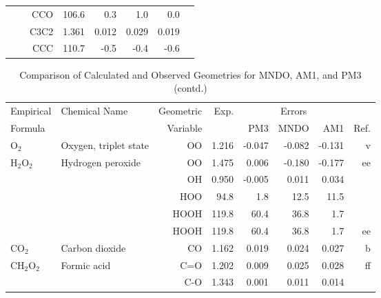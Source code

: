 \begin{table}
\begin{center}
\begin{tabular}{llrrrrrr}
             &                                    &CCO         &     106.6   &       0.3 &       1.0 &       0.0   &       \\
             &                                    &C3C2          &     1.361   &     0.012 &     0.029 &     0.019 &       \\
             &                                    &CCC         &     110.7   &      -0.5 &      -0.4 &      -0.6   &       \\
\hline
\end{tabular}
\end{center}
\end{table}
\clearpage

\begin{table}
\caption{\label{geotabd}Comparison of Calculated and Observed Geometries for 
MNDO, AM1, and PM3 (contd.)}
\begin{center}
\compresstable
\begin{tabular}{llrrrrrr}
 Empirical  & Chemical Name &  Geometric &  Exp. & \multicolumn{3}{c}{Errors} & \\
  Formula   &               &  Variable &        & PM3  & MNDO  &  AM1 & Ref.\\
\hline
 O$_2$          & Oxygen, triplet state              &OO            &     1.216   &    -0.047 &    -0.082 &    -0.131 &     v \\
 H$_2$O$_2$        & Hydrogen peroxide                  &OO            &     1.475   &     0.006 &    -0.180 &    -0.177 &    ee \\
        &                                    &OH            &     0.950   &    -0.005 &     0.011 &     0.034 &       \\
        &                                    &HOO         &      94.8   &       1.8 &      12.5 &      11.5   &       \\
        &                                    &HOOH        &     119.8   &      60.4 &      36.8 &       1.7   &       \\
        &                                    &HOOH        &     119.8   &      60.4 &      36.8 &       1.7   &    ee \\
 CO$_2$         & Carbon dioxide                     &CO            &     1.162   &     0.019 &     0.024 &     0.027 &     b \\
 CH$_2$O$_2$       & Formic acid                        &C=O           &     1.202   &     0.009 &     0.025 &     0.028 &    ff \\
        &                                    &C-O           &     1.343   &     0.001 &     0.011 &     0.014 &       \\

\end{tabular}
\end{center}
\end{table}
